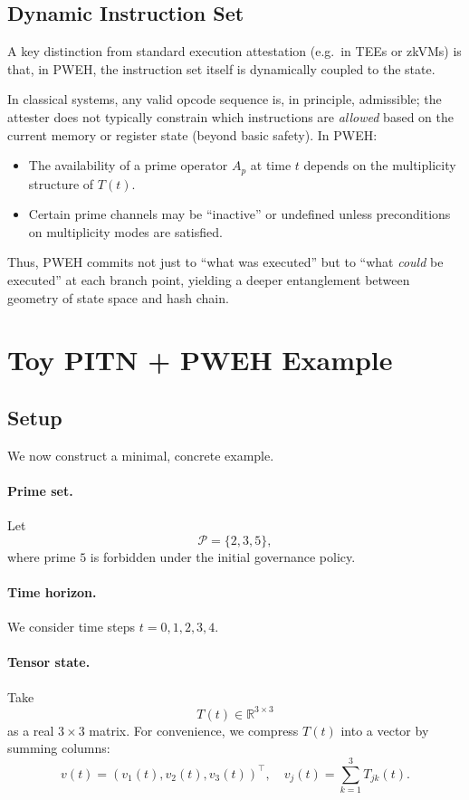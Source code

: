\documentclass[11pt]{article}
\begin{document}
\subsection{Dynamic Instruction Set}

A key distinction from standard execution attestation (e.g.\ in TEEs or zkVMs) is that, in PWEH, the instruction set itself is dynamically coupled to the state.

In classical systems, any valid opcode sequence is, in principle, admissible; the attester does not typically constrain which instructions are \emph{allowed} based on the current memory or register state (beyond basic safety).
In PWEH:

\begin{itemize}[leftmargin=1.5em]
  \item The availability of a prime operator \(A_p\) at time \(t\) depends on the multiplicity structure of \(T(t)\).
  \item Certain prime channels may be ``inactive'' or undefined unless preconditions on multiplicity modes are satisfied.
\end{itemize}

Thus, PWEH commits not just to ``what was executed'' but to ``what \emph{could} be executed'' at each branch point, yielding a deeper entanglement between geometry of state space and hash chain.

\section{Toy PITN + PWEH Example}

\subsection{Setup}

We now construct a minimal, concrete example.

\paragraph{Prime set.}
Let
\[
  \mathcal{P} = \{2,3,5\},
\]
where prime \(5\) is forbidden under the initial governance policy.

\paragraph{Time horizon.}
We consider time steps \(t = 0,1,2,3,4\).

\paragraph{Tensor state.}
Take
\[
  T(t) \in \mathbb{R}^{3 \times 3}
\]
as a real \(3 \times 3\) matrix.
For convenience, we compress \(T(t)\) into a vector by summing columns:
\[
  v(t) = (v_1(t), v_2(t), v_3(t))^\top, \quad
  v_j(t) = \sum_{k=1}^3 T_{jk}(t).
\]
\end{document}
